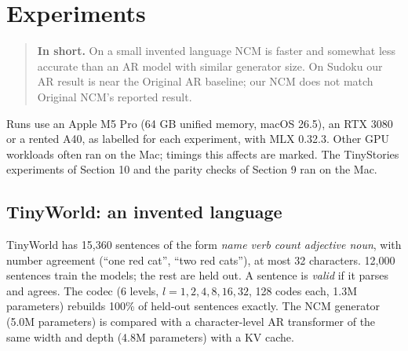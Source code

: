 \documentclass[
  british,
]{article}
\begin{document}
\section{Experiments}\label{experiments}

\begin{quote}
\textbf{In short.} On a small invented language NCM is faster and
somewhat less accurate than an AR model with similar generator size. On
Sudoku our AR result is near the Original AR baseline; our NCM does not
match Original NCM's reported result.
\end{quote}

Runs use an Apple M5 Pro (64 GB unified memory, macOS 26.5), an RTX 3080
or a rented A40, as labelled for each experiment, with MLX 0.32.3. Other
GPU workloads often ran on the Mac; timings this affects are marked. The
TinyStories experiments of Section 10 and the parity checks of Section 9
ran on the Mac.

\subsection{TinyWorld: an invented
language}\label{tinyworld-an-invented-language}

TinyWorld has 15,360 sentences of the form \emph{name verb count
adjective noun}, with number agreement (``one red cat'', ``two red
cats''), at most 32 characters. 12,000 sentences train the models; the
rest are held out. A sentence is \emph{valid} if it parses and agrees.
The codec (6 levels, \(l = 1, 2, 4, 8, 16, 32\), 128 codes each, 1.3M
parameters) rebuilds 100\% of held-out sentences exactly. The NCM
generator (5.0M parameters) is compared with a character-level AR
transformer of the same width and depth (4.8M parameters) with a KV
cache.
\end{document}
